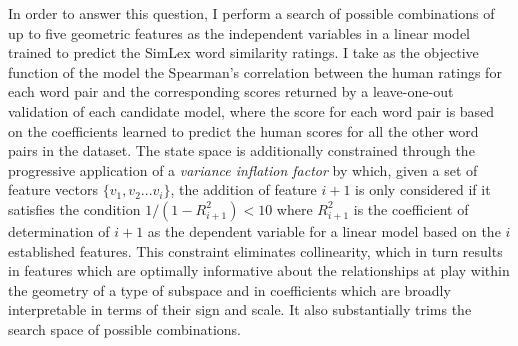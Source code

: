 In order to answer this question, I perform a search of possible combinations of up to five geometric features as the independent variables in a linear model trained to predict the SimLex word similarity ratings.  I take as the objective function of the model the Spearman's correlation between the human ratings for each word pair and the corresponding scores returned by a leave-one-out validation of each candidate model, where the score for each word pair is based on the coefficients learned to predict the human scores for all the other word pairs in the dataset.  The state space is additionally constrained through the progressive application of a \emph{variance inflation factor} \citep{OBrien2007} by which, given a set of feature vectors $\{v_1,v_2... v_i\}$, the addition of feature $i+1$ is only considered if it satisfies the condition $1/(1-R_{i+1}^{2}) < 10$ where $R_{i+1}^2$ is the coefficient of determination of $i+1$ as the dependent variable for a linear model based on the $i$ established features.  This constraint eliminates collinearity, which in turn results in features which are optimally informative about the relationships at play within the geometry of a type of subspace and in coefficients which are broadly interpretable in terms of their sign and scale.  It also substantially trims the search space of possible combinations.


